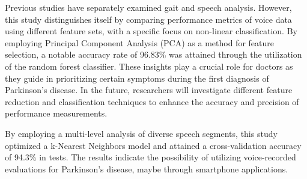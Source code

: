 Previous studies have separately examined gait and speech analysis. However, this study\cite{15} distinguishes itself by comparing performance metrics of voice data using different feature sets, with a specific focus on non-linear classification. By employing Principal Component Analysis (PCA) as a method for feature selection, a notable accuracy rate of 96.83\% was attained through the utilization of the random forest classifier. These insights play a crucial role for doctors as they guide in prioritizing certain symptoms during the first diagnosis of Parkinson's disease. In the future, researchers will investigate different feature reduction and classification techniques to enhance the accuracy and precision of performance measurements.

By employing a multi-level analysis of diverse speech segments, this study\cite{16} optimized a k-Nearest Neighbors model and attained a cross-validation accuracy of 94.3\% in tests. The results indicate the possibility of utilizing voice-recorded evaluations for Parkinson's disease, maybe through smartphone applications.